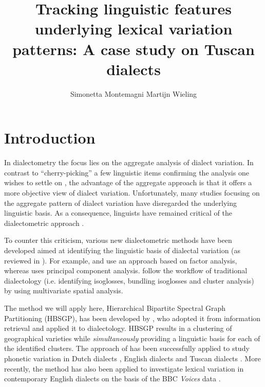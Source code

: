 \documentclass[output=paper]{LSP/langsci}
\author{Simonetta Montemagni\affiliation{Istituto di Linguistica Computazionale “Antonio Zampolli”, ILC-CNR} \lastand Martijn Wieling\affiliation{University of Groningen, CLCG}}
\title{Tracking linguistic features underlying lexical variation patterns: A case study on Tuscan dialects}
\begin{document}
 
 
% 

% 
% 
% 
% 

\section{Introduction}
In dialectometry \citep{seguy_relation_1971} the focus lies on the aggregate analysis of dialect variation. In contrast to “cherry-picking” a few linguistic items confirming the analysis one wishes to settle on \citep{nerbonne_data-driven_2009}, the advantage of the aggregate approach is that it offers a more objective view of dialect variation. Unfortunately, many studies focusing on the aggregate pattern of dialect variation have disregarded the underlying linguistic basis. As a consequence, linguists have remained critical of the dialectometric approach \citep{schneider_qualitative_1988,woolhiser_political_2005, loporcaro_profilo_2009}. 

To counter this criticism, various new dialectometric methods have been developed aimed at identifying the linguistic basis of dialectal variation (as reviewed in \citealt{wieling_advances_2015}). For example, \citet{nerbonne_identifying_2006} and \citet{proll_latente_inpress} use an approach based on factor analysis, whereas \citet{shackleton_english-american_2005} uses principal component analysis. \citet{grieve_statistical_2011} follow the workflow of traditional dialectology (i.e. identifying isoglosses, bundling isoglosses and cluster analysis) by using multivariate spatial analysis. 

The method we will apply here, Hierarchical Bipartite Spectral Graph Partitioning (HBSGP), has been developed by \citet{wieling_bipartite_2009,wieling_hierarchical_2010, wieling_bipartite_2011}, who adopted it from information retrieval \citep{dhillon_co-clustering_2001} and applied it to dialectology. HBSGP results in a clustering of geographical varieties while \emph{simultaneously }providing a linguistic basis for each of the identified clusters. The approach of \citet{wieling_bipartite_2011} has been successfully applied to study phonetic variation in Dutch dialects \citep{wieling_bipartite_2011}, English dialects \citep{wieling_analyzing_2013} and Tuscan dialects \citep{montemagni_patterns_2012,montemagni_synchronic_2013}. More recently, the method has also been applied to investigate lexical variation in contemporary English dialects on the basis of the BBC \textit{Voices} data \citep{wieling_lexical_2014}.
\end{document}
